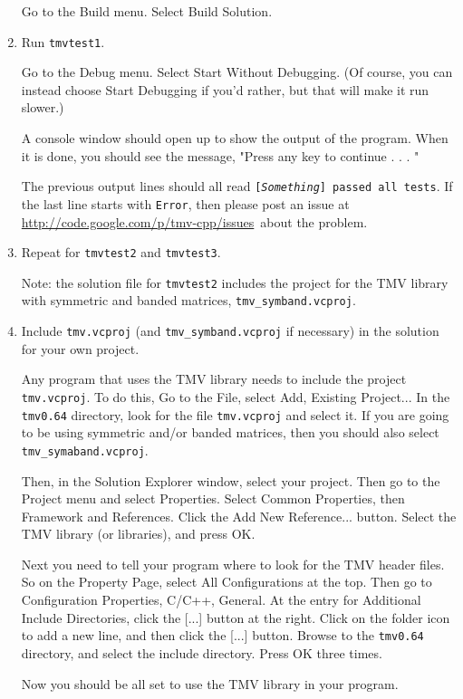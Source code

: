\documentclass[twoside,letterpaper,11pt]{article}
\newcommand{\tmvversion}{0.64}
\newcommand{\myissuesx}{http://code.google.com/p/tmv-cpp/issues}
\newcommand{\myissues}{\url{\myissuesx}}
\begin{document}
\begin{enumerate}
Go to the Build menu.  Select Build Solution.

\item 
Run \texttt{tmvtest1}.

Go to the Debug menu.  Select Start Without Debugging.  (Of course, you can instead
choose Start Debugging if you'd rather, but that will make it run slower.)

A console window should open up to show the output of the program.  
When it is done, you should see the message,
"Press any key to continue . . . "

The previous output lines should all read \texttt{[{\em Something}] passed all tests}.
If the last line starts with \texttt{Error}, 
then please post an issue at \myissues\ about the problem.

\item
Repeat for \texttt{tmvtest2} and \texttt{tmvtest3}.  

Note: the solution file for \texttt{tmvtest2} includes the
project for the TMV library with symmetric and banded matrices, \texttt{tmv\_symband.vcproj}.

\item
Include \texttt{tmv.vcproj} (and \texttt{tmv\_symband.vcproj} if necessary) in the solution for your own project.

Any program that uses the TMV library needs to include the project \texttt{tmv.vcproj}.  To do this,
Go to the File, select Add, Existing Project...
In the \texttt{tmv\tmvversion} directory, look for the file
\texttt{tmv.vcproj} and select it.  If you are going to be using symmetric and/or banded matrices,
then you should also select \texttt{tmv\_symaband.vcproj}.

Then, in the Solution Explorer window, select your project.  Then go to the Project menu
and select Properties.  Select Common Properties, then Framework and References.  
Click the Add New Reference... button.  Select the TMV library (or libraries), and press OK.

Next you need to tell your program where to look for the TMV header files.  So on the Property Page,
select All Configurations at the top.  Then go to Configuration Properties, C/C++, General.
At the entry for Additional Include Directories, click the [...] button at the right.  Click on the folder icon
to add a new line, and then click the [...] button.  Browse to the 
\texttt{tmv\tmvversion} directory, and select the include directory.  Press OK three times.

Now you should be all set to use the TMV library in your program.

\end{enumerate}
\end{document}
